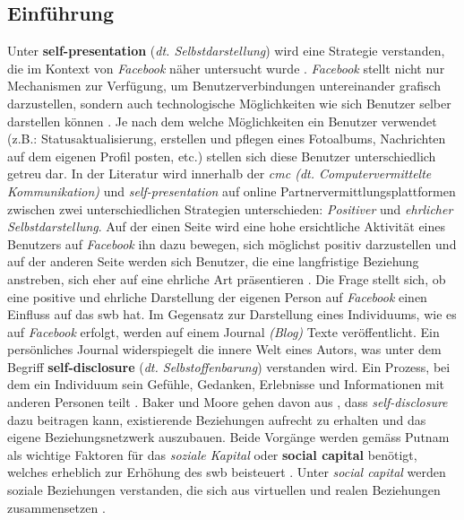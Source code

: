 \subsection{Einführung}\label{subsec.selfpEinführung}
Unter \textbf{self-presentation} (\textit{dt. Selbstdarstellung}) wird eine Strategie verstanden, die im Kontext von \textit{Facebook} näher untersucht wurde \cite[S.359ff]{Kim:2011}. \textit{Facebook} stellt nicht nur Mechanismen zur Verfügung, um Benutzerverbindungen untereinander grafisch darzustellen, sondern auch technologische Möglichkeiten wie sich Benutzer selber darstellen können \cite{Ellison:2007.1}. Je nach dem welche Möglichkeiten ein Benutzer verwendet (z.B.: Statusaktualisierung, erstellen und pflegen eines Fotoalbums, Nachrichten auf dem eigenen Profil posten, etc.) stellen sich diese Benutzer unterschiedlich getreu dar. In der Literatur wird innerhalb der \textit{\gls{cmc} (dt. Computervermittelte Kommunikation)} \cite{Tidwell:2002} und \textit{self-presentation} auf online Partnervermittlungsplattformen \cite{Gibbs:2006} zwischen zwei unterschiedlichen Strategien unterschieden: \textit{Positiver} und \textit{ehrlicher Selbstdarstellung}. Auf der einen Seite wird eine hohe ersichtliche Aktivität eines Benutzers auf \textit{Facebook} ihn dazu bewegen, sich möglichst positiv darzustellen \cite{Kimmerle:2008} und auf der anderen Seite werden sich Benutzer, die eine langfristige Beziehung anstreben, sich eher auf eine ehrliche Art präsentieren \cite{Gibbs:2006}. Die Frage stellt sich, ob eine positive und ehrliche Darstellung der eigenen Person auf \textit{Facebook} einen Einfluss auf das \gls{swb} hat.\newline
Im Gegensatz zur Darstellung eines Individuums, wie es auf \textit{Facebook} erfolgt, werden auf einem Journal \textit{(Blog)} Texte veröffentlicht. Ein persönliches Journal widerspiegelt die innere Welt eines Autors, was unter dem Begriff \textbf{self-disclosure} (\textit{dt. Selbstoffenbarung}) verstanden wird. Ein Prozess, bei dem ein Individuum sein Gefühle, Gedanken, Erlebnisse und Informationen mit anderen Personen teilt \cite{Derlega:1993}. Baker und Moore gehen davon aus \cite{Baker:2008}, dass \textit{self-disclosure} dazu beitragen kann, existierende Beziehungen aufrecht zu erhalten und das eigene Beziehungsnetzwerk auszubauen. Beide Vorgänge werden gemäss Putnam \cite{Putnam:2000} als wichtige Faktoren für das \textit{soziale Kapital} oder \textbf{social capital} benötigt, welches erheblich zur Erhöhung des \gls{swb} beisteuert \cite{Sirgy:2006}. Unter \textit{social capital} werden soziale Beziehungen verstanden, die sich aus virtuellen und realen Beziehungen zusammensetzen \cite{Ellison:2007}.
